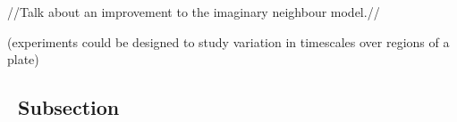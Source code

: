 //Talk about an improvement to the imaginary neighbour model.//




(experiments could be designed to study variation in timescales over
regions of a plate)


\subsection{\thesubsection~Subsection}

